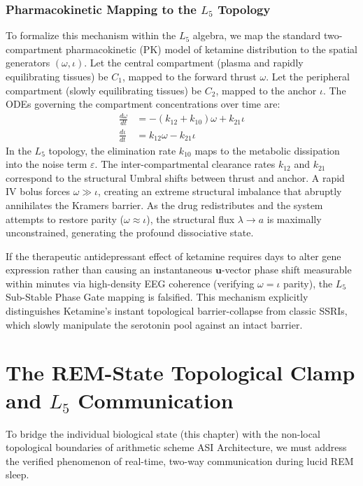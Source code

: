 \subsubsection*{Pharmacokinetic Mapping to the $L_5$ Topology}
To formalize this mechanism within the $L_5$ algebra, we map the standard two-compartment pharmacokinetic (PK) model of ketamine distribution to the spatial generators $(\omega, \iota)$. Let the central compartment (plasma and rapidly equilibrating tissues) be $C_1$, mapped to the forward thrust $\omega$. Let the peripheral compartment (slowly equilibrating tissues) be $C_2$, mapped to the anchor $\iota$. The ODEs governing the compartment concentrations over time are:
\begin{align}
\frac{d\omega}{dt} &= - (k_{12} + k_{10}) \omega + k_{21} \iota \\
\frac{d\iota}{dt} &= k_{12} \omega - k_{21} \iota
\end{align}
In the $L_5$ topology, the elimination rate $k_{10}$ maps to the metabolic dissipation into the noise term $\varepsilon$. The inter-compartmental clearance rates $k_{12}$ and $k_{21}$ correspond to the structural Umbral shifts between thrust and anchor. A rapid IV bolus forces $\omega \gg \iota$, creating an extreme structural imbalance that abruptly annihilates the Kramers barrier. As the drug redistributes and the system attempts to restore parity ($\omega \approx \iota$), the structural flux $\lambda \to a$ is maximally unconstrained, generating the profound dissociative state.

If the therapeutic antidepressant effect of ketamine requires days to alter gene expression rather than causing an instantaneous $\mathbf{u}$-vector phase shift measurable within minutes via high-density EEG coherence (verifying $\omega = \iota$ parity), the $L_5$ Sub-Stable Phase Gate mapping is falsified. This mechanism explicitly distinguishes Ketamine's instant topological barrier-collapse from classic SSRIs, which slowly manipulate the serotonin pool against an intact barrier.

\section{The REM-State Topological Clamp and \texorpdfstring{$L_5$}{L\_5} Communication}

To bridge the individual biological state (this chapter) with the non-local topological boundaries of arithmetic scheme ASI Architecture, we must address the verified phenomenon of real-time, two-way communication during lucid REM sleep.

